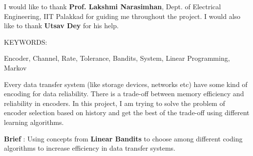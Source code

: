 \documentclass[BTech,thesis]{iitmdiss}
\begin{document}
\acknowledgements

I would like to thank \textbf{Prof. Lakshmi Narasimhan}, Dept. of Electrical Engineering, IIT Palakkad for guiding me throughout the project. I would also like to thank \textbf{Utsav Dey} for his help.


\abstract

\noindent KEYWORDS: \hspace*{0.5em} \parbox[t]{4.4in}{Encoder, Channel, Rate, Tolerance, Bandits, System, Linear Programming, Markov}

\vspace*{24pt}

\noindent Every data transfer system (like
storage devices, networks etc) have some
kind of encoding for data reliability. There is a
trade-off between memory efficiency and
reliability in encoders. In this project, I am
trying to solve the problem of encoder selection
based on history and get the best of the trade-off
using different learning algorithms.

\vspace*{15pt}

\textbf{Brief} : Using concepts from \textbf{Linear Bandits} to
choose among different coding algorithms to
increase efficiency in data transfer systems.



\pagebreak


\begin{singlespace}
\tableofcontents
\thispagestyle{empty}

\listoftables
{}
\listoffigures
{}
\end{singlespace}
\end{document}

